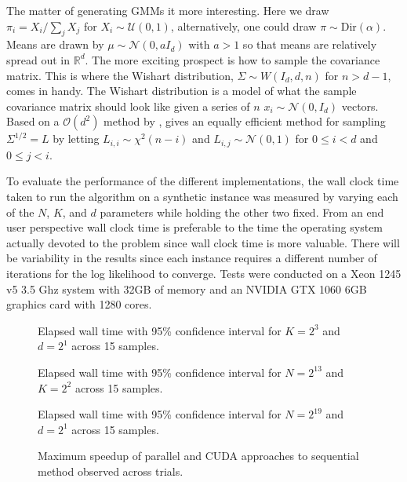 \documentclass{article}
\newcommand{\boundedBy}[1]{\mathcal{O} \left ( #1 \right )}
\begin{document}
The matter of generating GMMs it more interesting. Here we draw $\pi_i = X_i / \sum_{j} X_j$ for $X_i \sim \mathcal{U}(0, 1)$, alternatively, one could draw $\pi \sim \text{Dir}(\alpha)$. Means are drawn by $\mu \sim \mathcal{N}(0, a I_d)$ with $a > 1$ so that means are relatively spread out in $\mathbb{R}^{d}$. The more exciting prospect is how to sample the covariance matrix. This is where the Wishart distribution, $\Sigma \sim W(I_d, d, n)$ for $n > d - 1$, comes in handy. The Wishart distribution is a model of what the sample covariance matrix should look like given a series of $n$ $x_i \sim \mathcal{N}(0, I_d)$ vectors. Based on a $\boundedBy{d^2}$ method by \cite{odell1966numerical}, \cite{sawyer2007wishart} gives an equally efficient method for sampling $\Sigma^{1/2} = L$ by letting $L_{i,i} \sim \chi^2(n - i)$ and $L_{i,j} \sim \mathcal{N}(0, 1)$ for $0 \le i < d$ and $0 \le j < i$. 

To evaluate the performance of the different implementations, the wall clock time taken to run the algorithm on a synthetic instance was measured by varying each of the $N$, $K$, and $d$ parameters while holding the other two fixed. From an end user perspective wall clock time is preferable to the time the operating system actually devoted to the problem since wall clock time is more valuable. There will be variability in the results since each instance requires a different number of iterations for the log likelihood to converge. Tests were conducted on a Xeon 1245 v5 3.5 Ghz system with 32GB of memory and an NVIDIA GTX 1060 6GB graphics card with 1280 cores.

\begin{multicols}{2}
\begin{figure}[H]
	\centering
	\resizebox{\linewidth}{!}{}
	\caption{Elapsed wall time with 95\% confidence interval for $K = 2^{3}$ and $d = 2^{1}$ across 15 samples.}
	\label{fig:timeNumPoints}
\end{figure}

\begin{figure}[H]
	\centering
	\resizebox{\linewidth}{!}{}
	\caption{Elapsed wall time with 95\% confidence interval for $N = 2^{13}$ and $K = 2^{2}$ across 15 samples.}
	\label{fig:timePointDim}
\end{figure}

\columnbreak

\begin{figure}[H]
	\centering
	\resizebox{\linewidth}{!}{}
	\caption{Elapsed wall time with 95\% confidence interval for $N = 2^{19} $ and $d = 2^{1}$ across 15 samples.}
	\label{fig:timeNumComponents}
\end{figure}

\begin{figure}[H]
	\centering
	\caption{Maximum speedup of parallel and CUDA approaches to sequential method observed across trials.}
	\label{fig:sppedup}
\end{figure}
\end{multicols}
\end{document}
